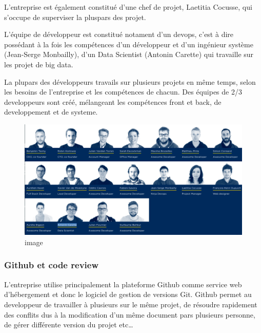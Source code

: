 \documentclass[12pt,a4paper]{article}
\begin{document}
  \bigskip

  L'entreprise est également constitué d'une chef de projet, Laetitia
  Cocusse, qui s'occupe de superviser la pluspars des projet.

  \bigskip

  L'équipe de développeur est constitué notament d'un devops, c'est à dire
  possédant à la fois les compétences d'un développeur et d'un ingénieur
  système (Jean-Serge Monbailly), d'un Data Scientist (Antonin Carette)
  qui travaille sur les projet de big data.

  \bigskip

  La plupars des développeurs travails sur plusieurs projets en même
  temps, selon les besoins de l'entreprise et les compétences de chacun.
  Des équipes de 2/3 developpeurs sont créé, mélangeant les compétences
  front et back, de developpement et de systeme.

  \bigskip

  \begin{figure}
  \centering
  \includegraphics{team.png}
  \caption{image}
  \end{figure}

  \subsubsection{Github et code review}\label{github-et-code-review}

  \bigskip

  L'entreprise utilise principalement la plateforme Github comme service
  web d'hébergement et donc le logiciel de gestion de versions Git. Github
  permet au developpeur de travailler à plusieurs sur le même projet, de
  résoudre rapidement des conflits dus à la modification d'un même
  document pars plusieurs personne, de gérer différente version du projet
  etc\ldots{}

  \bigskip
\end{document}
